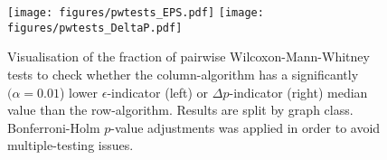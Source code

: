 \documentclass[twoside]{article}
\begin{document}
\begin{landscape}
\begin{figure}[h!]
    \centering
    \texttt{[image: figures/pwtests\_EPS.pdf]}
    \texttt{[image: figures/pwtests\_DeltaP.pdf]}
    \caption{Visualisation of the fraction of pairwise Wilcoxon-Mann-Whitney tests to check whether the column-algorithm has a significantly $(\alpha = 0.01$) lower $\epsilon$-indicator (left) or $\Delta p$-indicator (right) median value than the row-algorithm. Results are split by graph class. Bonferroni-Holm $p$-value adjustments was applied in order to avoid multiple-testing issues.}
    \label{fig:pairwise_tests_eps_deltap}
\end{figure}
\end{landscape}


\begin{landscape}

\end{landscape}

\begin{landscape}

\end{landscape}

\small


\end{document}
